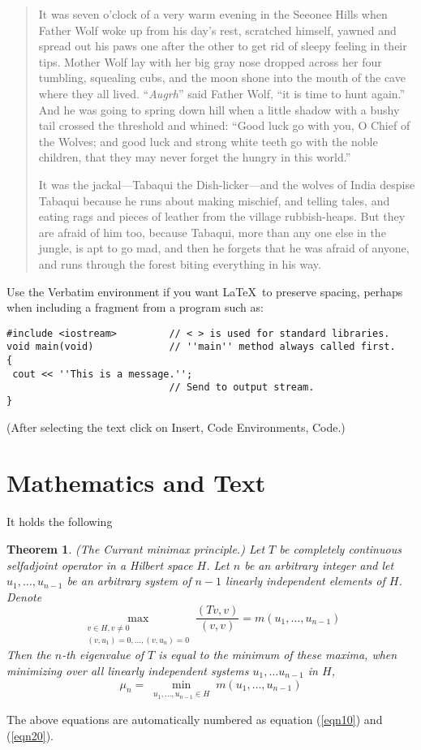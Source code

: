 \documentclass{amsbook}%
\theoremstyle{plain}
\newtheorem{theorem}{Theorem}
\numberwithin{equation}{section}
\begin{document}
\begin{quotation}
It was seven o'clock of a very warm evening in the Seeonee Hills
when Father Wolf woke up from his day's rest, scratched himself,
yawned  and spread out his paws one after the other to get rid of
sleepy feeling in their tips. Mother Wolf lay with her big gray
nose dropped across her four tumbling, squealing cubs, and the
moon shone into the mouth of the cave where they all lived.
``\emph{Augrh}'' said Father Wolf, ``it is time to hunt again.''
And he was going to spring down hill when a little shadow with a
bushy tail crossed the threshold and whined: ``Good luck go with
you, O Chief of the Wolves; and good luck and strong white teeth
go with the noble children, that they may never forget the hungry
in this world.''

It was the jackal---Tabaqui the Dish-licker---and the wolves of
India despise Tabaqui because he runs about making mischief, and
telling tales, and eating rags and pieces of leather from the
village rubbish-heaps. But they are afraid of him too, because
Tabaqui, more than any one else in the jungle, is apt to go mad,
and then he forgets that he was afraid of anyone, and runs through
the forest biting everything in his way.
\end{quotation}

Use the Verbatim environment if you want \LaTeX\ to preserve
spacing, perhaps when including a fragment from a program such as:
\begin{verbatim}
#include <iostream>         // < > is used for standard libraries.
void main(void)             // ''main'' method always called first.
{
 cout << ''This is a message.'';
                            // Send to output stream.
}
\end{verbatim}
(After selecting the text click on Insert, Code Environments,
Code.)


\section{Mathematics and Text}

It holds \cite{KarelRektorys} the following
\begin{theorem}
(The Currant minimax principle.) Let $T$ be completely continuous
selfadjoint operator in a Hilbert space $H$. Let $n$ be an
arbitrary integer and let $u_1,\ldots,u_{n-1}$ be an arbitrary
system of $n-1$ linearly independent elements of $H$. Denote
\begin{equation}
\max_{\substack{v\in H, v\neq
0\\(v,u_1)=0,\ldots,(v,u_n)=0}}\frac{(Tv,v)}{(v,v)}=m(u_1,\ldots,
u_{n-1}) \label{eqn10}
\end{equation}
Then the $n$-th eigenvalue of $T$ is equal to the minimum of these
maxima, when minimizing over all linearly independent systems
$u_1,\ldots u_{n-1}$ in $H$,
\begin{equation}
\mu_n = \min_{\substack{u_1,\ldots, u_{n-1}\in H}} m(u_1,\ldots,
u_{n-1}) \label{eqn20}
\end{equation}
\end{theorem}
The above equations are automatically numbered as equation
(\ref{eqn10}) and (\ref{eqn20}).
\end{document}
